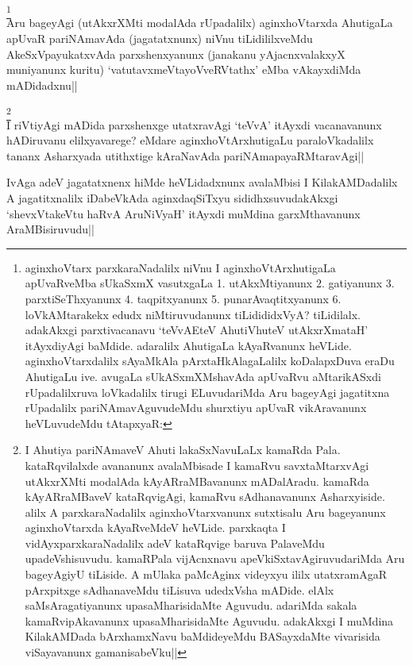 \begin{artha}
\footnote[1]{aginxhoVtarx parxkaraNadalilx niVnu I 
aginxhoVtArxhutigaLa apUvaRveMba sUkaSxmX vasutxgaLa 1. utAkxMtiyanunx 
2. gatiyanunx 3. parxtiSeThxyanunx 4. taqpitxyanunx 5. 
punarAvaqtitxyanunx 6. loVkAMtarakekx edudx niMtiruvudanunx 
tiLidididxVyA? tiLidilalx. adakAkxgi parxtivacanavu `teVvAEteV 
AhutiVhuteV utAkxrXmataH' itAyxdiyAgi baMdide. adaralilx AhutigaLa 
kAyaRvanunx heVLide. aginxhoVtarxdalilx sAyaMkAla pArxtaHkAlagaLalilx 
koDalapxDuva eraDu AhutigaLu ive. avugaLa sUkASxmXMshavAda apUvaRvu 
aMtarikASxdi rUpadalilxruva loVkadalilx tirugi ELuvudariMda Aru 
bageyAgi jagatitxna rUpadalilx pariNAmavAguvudeMdu shurxtiyu apUvaR 
vikAravanunx heVLuvudeMdu tAtapxyaR:}\\
Aru bageyAgi (utAkxrXMti modalAda rUpadalilx) aginxhoVtarxda AhutigaLa 
apUvaR pariNAmavAda (jagatatxnunx) niVnu tiLidililxveMdu 
AkeSxVpayukatxvAda parxshenxyanunx (janakanu yAjacnxvalakxyX 
muniyanunx kuritu) `vatutavxmeVtayoVveRVtathx' eMba vAkayxdiMda 
mADidadxnu||
\end{artha}

\begin{artha}
\footnote[2]{I Ahutiya pariNAmaveV Ahuti lakaSxNavuLaLx kamaRda Pala. 
kataRqvilalxde avananunx avalaMbisade I kamaRvu savxtaMtarxvAgi 
utAkxrXMti modalAda kAyARraMBavanunx mADalAradu. kamaRda kAyARraMBaveV 
kataRqvigAgi, kamaRvu sAdhanavanunx Asharxyiside. alilx A 
parxkaraNadalilx aginxhoVtarxvanunx sutxtisalu Aru bageyanunx 
aginxhoVtarxda kAyaRveMdeV heVLide. parxkaqta I vidAyxparxkaraNadalilx 
adeV kataRqvige baruva PalaveMdu upadeVshisuvudu. kamaRPala 
vijAcnxnavu apeVkiSxtavAgiruvudariMda Aru bageyAgiyU tiLiside. A 
mUlaka paMcAginx videyxyu ililx utatxramAgaR pArxpitxge sAdhanaveMdu 
tiLisuva udedxVsha mADide. elAlx saMsAragatiyanunx upasaMharisidaMte 
Aguvudu. adariMda sakala kamaRvipAkavanunx upasaMharisidaMte Aguvudu. 
adakAkxgi I muMdina KilakAMDada bArxhamxNavu baMdideyeMdu BASayxdaMte 
vivarisida viSayavanunx gamanisabeVku||}\\
I riVtiyAgi mADida parxshenxge utatxravAgi `teVvA' itAyxdi 
vacanavanunx hADiruvanu elilxyavarege? eMdare aginxhoVtArxhutigaLu 
paraloVkadalilx tananx Asharxyada utithxtige kAraNavAda 
pariNAmapayaRMtaravAgi||
\end{artha}

\begin{artha}
IvAga adeV jagatatxnenx hiMde heVLidadxnunx avalaMbisi I 
KilakAMDadalilx A jagatitxnalilx iDabeVkAda aginxdaqSiTxyu 
sididhxsuvudakAkxgi `shevxVtakeVtu haRvA AruNiVyaH' itAyxdi muMdina 
garxMthavanunx AraMBisiruvudu||
\end{artha}

